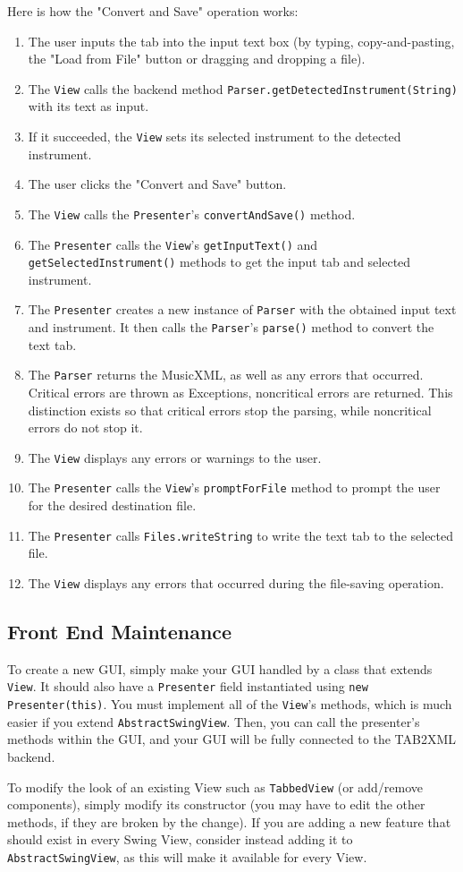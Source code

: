 \documentclass[11pt]{article}
\begin{document}
Here is how the "Convert and Save" operation works:
\begin{enumerate}
\item The user inputs the tab into the input text box (by typing, copy-and-pasting, the "Load from File" button or dragging and dropping a file).
\item The \texttt{View} calls the backend method \texttt{Parser.getDetectedInstrument(String)} with its text as input.
\item If it succeeded, the \texttt{View} sets its selected instrument to the detected instrument.
\item The user clicks the "Convert and Save" button.
\item The \texttt{View} calls the \texttt{Presenter}'s \texttt{convertAndSave()} method.
\item The \texttt{Presenter} calls the \texttt{View}'s \texttt{getInputText()} and \texttt{getSelectedInstrument()} methods to get the input tab and selected instrument.
\item The \texttt{Presenter} creates a new instance of \texttt{Parser} with the obtained input text and instrument.  It then calls the \texttt{Parser}'s \texttt{parse()} method to convert the text tab.
\item The \texttt{Parser} returns the MusicXML, as well as any errors that occurred.  Critical errors are thrown as Exceptions, noncritical errors are returned.  This distinction exists so that critical errors stop the parsing, while noncritical errors do not stop it.
\item The \texttt{View} displays any errors or warnings to the user.
\item The \texttt{Presenter} calls the \texttt{View}'s \texttt{promptForFile} method to prompt the user for the desired destination file.
\item The \texttt{Presenter} calls \texttt{Files.writeString} to write the text tab to the selected file.
\item The \texttt{View} displays any errors that occurred during the file-saving operation.
\end{enumerate}
\subsection{Front End Maintenance}
\label{sec:orgbaeb792}
To create a new GUI, simply make your GUI handled by a class that extends \texttt{View}.  It should also have a \texttt{Presenter} field instantiated using \texttt{new Presenter(this)}.  You must implement all of the \texttt{View}'s methods, which is much easier if you extend \texttt{AbstractSwingView}.  Then, you can call the presenter's methods within the GUI, and your GUI will be fully connected to the TAB2XML backend.

To modify the look of an existing View such as \texttt{TabbedView} (or add/remove components), simply modify its constructor (you may have to edit the other methods, if they are broken by the change).  If you are adding a new feature that should exist in every Swing View, consider instead adding it to \texttt{AbstractSwingView}, as this will make it available for every View.
\end{document}
